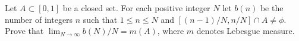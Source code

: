 Let $A\subset [0,1]$ be a closed set. For each positive integer $N$
let $b(n)$ be the number of integers $n$ such that $1\leq n\leq N$ and
$[(n-1)/N,n/N]\cap A\neq \phi$. Prove that $\lim_{N\rightarrow
\infty}b(N)/N=m(A)$, where $m$ denotes Lebesgue measure.
